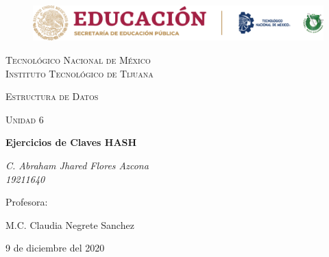 \documentclass[letterpaper, 12pt]{article}
\begin{document}
    
    \begin{titlepage}
        \begin{figure}[ht]
            \centering
            \includegraphics[width=15cm]{logosITT.png}
        \end{figure}
        \centering
        {\scshape\LARGE Tecnológico Nacional de México\\Instituto Tecnológico de Tijuana\par}
        \vspace{1cm}
        {\scshape\Large Estructura de Datos\par}
        \vspace{1cm}
        {\scshape\Large Unidad 6\par}
        \vspace{1.5cm}
        {\huge\bfseries Ejercicios de Claves HASH\par}
        \vspace{2cm}
        {\Large\itshape C. Abraham Jhared Flores Azcona\\19211640\par}
        \vfill
        Profesora: \par
        M.C. Claudia Negrete Sanchez
        
        \vfill

        {\large 9 de diciembre del 2020}
    \end{titlepage}

    \newpage
    \thispagestyle{fancy}
    \setcounter{page}{1}
    
\end{document}
